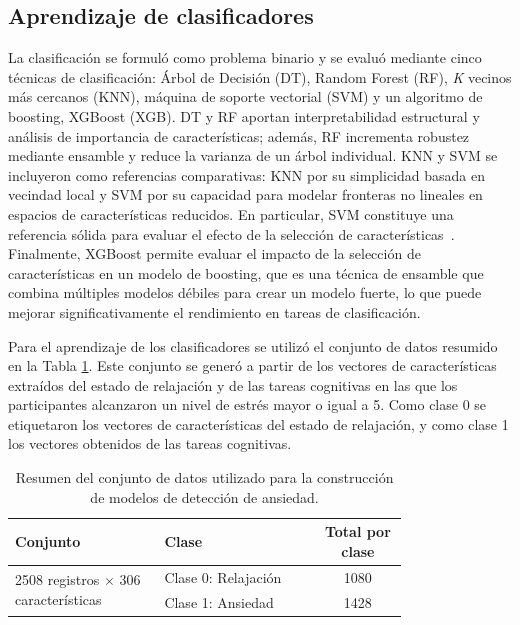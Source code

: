 \documentclass[runningheads]{llncs}
\begin{document}
\subsection{Aprendizaje de clasificadores}
La clasificación se formuló como problema binario y se evaluó mediante cinco técnicas de clasificación: Árbol de Decisión (DT), Random Forest (RF), \textit{K} vecinos más cercanos (KNN), máquina de soporte vectorial (SVM) y un algoritmo de boosting, XGBoost (XGB). DT y RF aportan interpretabilidad estructural y análisis de importancia de características; además, RF incrementa robustez mediante ensamble y reduce la varianza de un árbol individual. KNN y SVM se incluyeron como referencias comparativas: KNN por su simplicidad basada en vecindad local y SVM por su capacidad para modelar fronteras no lineales en espacios de características reducidos. En particular, SVM constituye una referencia sólida para evaluar el efecto de la selección de características~\cite{Cortes1995}. Finalmente, XGBoost permite evaluar el impacto de la selección de características en un modelo de boosting, que es una técnica de ensamble que combina múltiples modelos débiles para crear un modelo fuerte, lo que puede mejorar significativamente el rendimiento en tareas de clasificación.

Para el aprendizaje de los clasificadores se utilizó el conjunto de datos resumido en la Tabla \ref{tab:registros}. Este conjunto se generó a partir de los vectores de características extraídos del estado de relajación y de las tareas cognitivas en las que los participantes alcanzaron un nivel de estrés mayor o igual a 5. Como clase 0 se etiquetaron los vectores de características del estado de relajación, y como clase 1 los vectores obtenidos de las tareas cognitivas.

\FloatBarrier

\begin{table}[!htbp]
\centering
\caption{Resumen del conjunto de datos utilizado para la construcción de modelos de detección de ansiedad.}
\label{tab:registros}
\small
\begin{tabular}{p{0.38\linewidth} p{0.4\linewidth} c}
\hline
\textbf{Conjunto} & \textbf{Clase} & \textbf{Total por clase} \\
\hline
\multirow{2}{=}{2508 registros $\times$ 306 características} & Clase 0: Relajación & 1080 \\
& Clase 1: Ansiedad & 1428 \\
\hline
\end{tabular}
\end{table}
\end{document}
